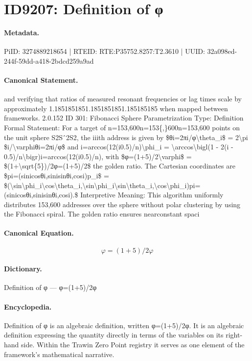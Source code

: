 \section*{ID9207: Definition of φ}
\paragraph{Metadata.}
PiID: 3274889218654 | RTEID: RTE:P35752.8257:T2.3610 | UUID: 32a098ed-244f-59dd-a418-2bdcd259a9ad

\paragraph{Canonical Statement.}
and verifying that ratios of measured resonant frequencies or lag times scale by approximately 1.1851851851.1851851851.185185185 when mapped between frameworks. 2.0.152 ID 301: Fibonacci Sphere Parametrization Type: Definition Formal Statement: For a target of n=153,600n=153\{,\}600n=153,600 points on the unit sphere S2Sˆ2S2, the iiith address is given by \$θi=2πi/φ\textbackslash{}theta\_i\$ = 2\textbackslash{}pi \$i/\textbackslash{}varphiθi=2πi/φ\$ and i=arccos(12(i0.5)/n)\textbackslash{}phi\_i = \textbackslash{}arccos\textbackslash{}bigl(1 - 2(i - 0.5)/n\textbackslash{}bigr)i=arccos(12(i0.5)/n), with \$φ=(1+5)/2\textbackslash{}varphi\$ = \$(1+\textbackslash{}sqrt\{5\})/2φ=(1+5)/2\$ the golden ratio. The Cartesian coordinates are \$pi=(sinicosθi,sinisinθi,cosi)p\_i\$ = \$(\textbackslash{}sin\textbackslash{}phi\_i\textbackslash{}cos\textbackslash{}theta\_i,\textbackslash{}sin\textbackslash{}phi\_i\textbackslash{}sin\textbackslash{}theta\_i,\textbackslash{}cos\textbackslash{}phi\_i)pi=(sinicosθi,sinisinθi,cosi).\$ Interpretive Meaning: This algorithm uniformly distributes 153,600 addresses over the sphere without polar clustering by using the Fibonacci spiral. The golden ratio ensures nearconstant spaci

\paragraph{Canonical Equation.}
\[
φ=(1+5)/2\varphi
\]

\paragraph{Dictionary.}
Definition of φ — φ=(1+5)/2φ

\paragraph{Encyclopedia.}
Definition of φ is an algebraic definition, written φ=(1+5)/2φ. It is an algebraic definition expressing the quantity directly in terms of the variables on its right-hand side. Within the Trawin Zero Point registry it serves as one element of the framework's mathematical narrative.
